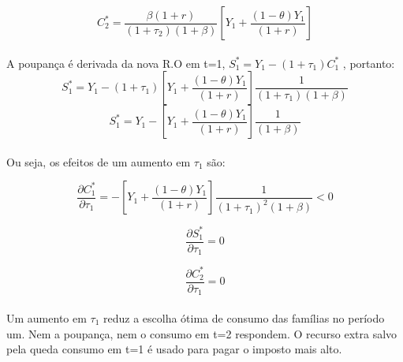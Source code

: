 \documentclass{article}
\begin{document}
\begin{equation}
    C_2^*=\frac{\beta(1+r)}{(1+\tau_2)(1+\beta)}\left[ Y_1+\frac{(1-\theta)Y_1}{(1+r)}\right]
\end{equation}
\\
A poupança é derivada da nova R.O em t=1, $S_1^*=Y_1- (1+\tau_1)C_1^*$ , portanto:
\begin{equation}
    S_1^*=Y_1-(1+\tau_1)\left[ Y_1+\frac{(1-\theta)Y_1}{(1+r)}\right]\frac{1}{(1+\tau_1)(1+\beta)}
\end{equation}
\begin{equation}
    S_1^*=Y_1-\left[ Y_1+\frac{(1-\theta)Y_1}{(1+r)}\right]\frac{1}{(1+\beta)}
\end{equation}
\\
Ou seja, os efeitos de um aumento em $\tau_1$ são:

\begin{equation}
    \frac{\partial C_1^*}{\partial\tau_1}=-\left[ Y_1+\frac{(1-\theta)Y_1}{(1+r)}\right]\frac{1}{(1+\tau_1)^2(1+\beta)} < 0
\end{equation}

\begin{equation}
    \frac{\partial S_1^*}{\partial\tau_1} = 0
\end{equation}

\begin{equation}
    \frac{\partial C_2^*}{\partial\tau_1} = 0 
\end{equation}
\\
Um aumento em $\tau_1$ reduz a escolha ótima de consumo das famílias no período um. Nem a poupança, nem o consumo em t=2 respondem. O recurso extra salvo pela queda consumo em t=1 é usado para pagar o imposto mais alto.
\clearpage
\end{document}
